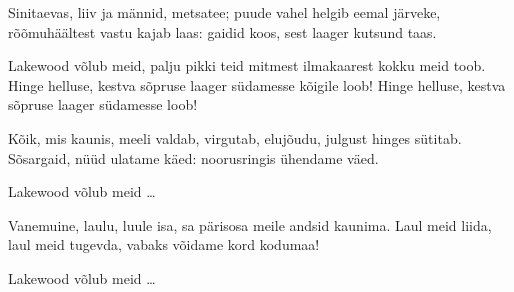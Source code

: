 Sinitaevas, liiv ja m\"annid, metsatee;
puude vahel helgib eemal j\"arveke,
r\~o\~omuh\"a\"altest vastu kajab laas:
gaidid koos, sest laager kutsund taas.

Lakewood v\~olub meid,
palju pikki teid
mitmest ilmakaarest kokku meid toob.
Hinge helluse,
kestva s\~opruse
laager s\"udamesse k\~oigile loob!
Hinge helluse,
kestva s\~opruse
laager s\"udamesse loob!

K\~oik, mis kaunis, meeli valdab, virgutab,
eluj\~oudu, julgust hinges s\"utitab.
S\~osargaid, n\"u\"ud ulatame k\"aed:
noorusringis \"uhendame v\"aed.

Lakewood v\~olub meid \ldots

Vanemuine, laulu, luule isa, sa
p\"arisosa meile andsid kaunima.
Laul meid liida, laul meid tugevda,
vabaks v\~oidame kord kodumaa!

Lakewood v\~olub meid \ldots